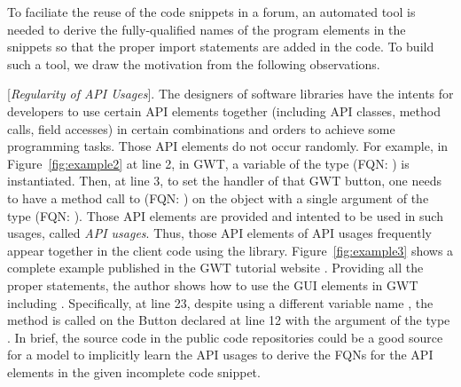 To faciliate the reuse of the code snippets in a forum, an automated
tool is needed to derive the fully-qualified names of the program
elements in the snippets so that the proper import statements are
added in the code. To build such a tool, we draw the motivation from
the following observations.

\vspace{2pt}
 [{\em Regularity of API Usages}]. The
designers of software libraries have the intents for developers to use
certain API elements together (including API classes, method calls,
field accesses) in certain combinations and orders to achieve some
programming tasks. Those API elements do not occur randomly. For
example, in Figure~\ref{fig:example2} at line 2, in GWT, a variable of
the type  (FQN:
) is instantiated. Then, at
line 3, to set the handler of that GWT button, one needs to have a
method call to  (FQN:
) on
the  object with a single argument of the type
 (FQN:
).
Those API elements are provided and intented to be used in such
usages, called {\em API usages}. Thus, those API elements of API
usages frequently appear together in the client code using the
library. Figure~\ref{fig:example3} shows a complete example published
in the GWT tutorial website . Providing all the
proper  statements, the author shows how to use the GUI
elements in GWT including . Specifically, at line 23,
despite using a different variable name , the
method  is called on the Button declared at line
12 with the argument of the type . In brief, the
source code in the public code repositories could be a good source for
a model to implicitly learn the API usages to derive the FQNs for the
API elements in the given incomplete code snippet.



